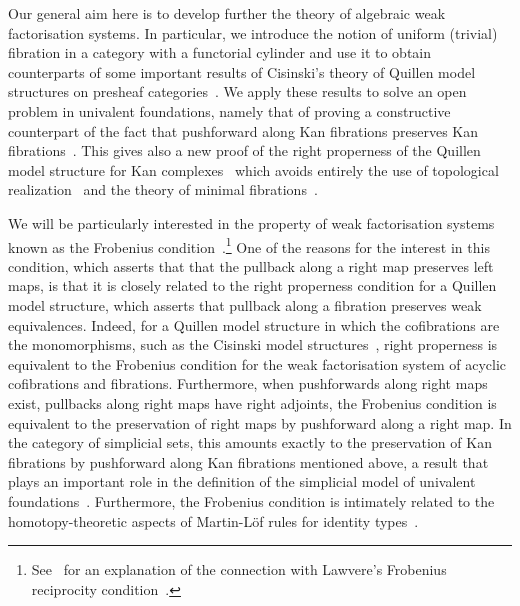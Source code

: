\documentclass[reqno,10pt,a4paper,oneside,draft]{amsart}
\begin{document}
  
 Our general aim here is to develop further the theory of algebraic weak factorisation systems. In particular, we introduce the 
 notion of uniform (trivial) fibration in  a category with a functorial cylinder
and use it to obtain  counterparts of some important results of Cisinski's theory of Quillen model structures on presheaf categories~\cite{cisinski-asterisque}. We  apply these results  to solve an open problem in univalent foundations, namely that of proving a constructive counterpart of the
 fact that pushforward along Kan fibrations preserves Kan fibrations~\cite{coquand-non-constructivity-kan,voevodsky-simplicial-model}. This gives also a new proof of the right 
 properness of the Quillen model structure for Kan complexes~\cite{quillen-homotopical}
 which avoids entirely the use of topological realization~\cite{hovey-model-categories} and
 the theory of minimal fibrations~\cite{joyal-tierney:simplicial-homotopy-theory}.

We will be particularly  interested in the property of weak factorisation systems  
known as the Frobenius 
condition~\cite[Definition~3.2.1]{garner:types-omega-groupoids}.\footnote{See~\cite{clementino:frobenius}
for an explanation of the connection with Lawvere's Frobenius reciprocity 
condition~\cite{lawvere-equality}.}
One of the reasons for the interest in this condition, 
which asserts that that the pullback along a right map preserves left maps, is that it is closely related to the
right properness condition for a Quillen model structure, which asserts that pullback along a fibration preserves weak 
equivalences. Indeed, for 
a Quillen model structure in which the cofibrations are the monomorphisms, such as the Cisinski model structures~\cite{cisinski-asterisque},   
right properness  is equivalent to the Frobenius condition for the  weak factorisation system of acyclic cofibrations and fibrations. 
Furthermore, when  pushforwards along right maps exist, \ie pullbacks along  right maps have right adjoints, the Frobenius condition
is equivalent to the preservation of right maps by pushforward along a right map. In the category of simplicial sets, this amounts exactly to the preservation of Kan fibrations by pushforward along Kan fibrations mentioned above, 
a result that plays an important role in the definition of the simplicial model of univalent foundations~\cite[Lemma~2.3.1]{voevodsky-simplicial-model}.
Furthermore, the Frobenius condition is intimately related to the homotopy-theoretic aspects of Martin-L\"of rules for identity types~\cite{gambino-garner:idtypewfs}.
\end{document}
